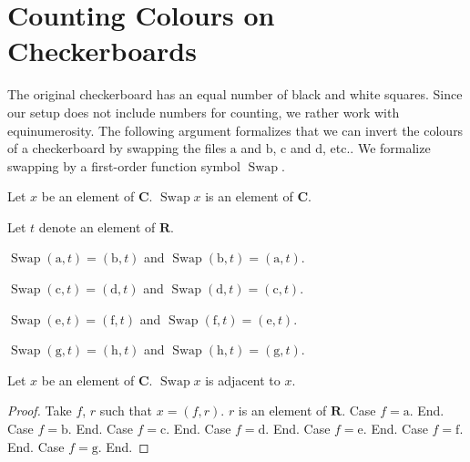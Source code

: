 \documentclass{article}
\newcommand{\Rank}{\mathbf{R}} %
\newcommand{\fileA}{\mathrm{a}}
\newcommand{\fileB}{\mathrm{b}}
\newcommand{\fileC}{\mathrm{c}}
\newcommand{\fileD}{\mathrm{d}}
\newcommand{\fileE}{\mathrm{e}}
\newcommand{\fileF}{\mathrm{f}}
\newcommand{\fileG}{\mathrm{g}}
\newcommand{\fileH}{\mathrm{h}}
\newcommand{\Checkerboard}{\mathbf{C}}
\newcommand{\Swap}[1]{\operatorname{Swap}#1}
\begin{document}
\section{Counting Colours on Checkerboards}

The original checkerboard has an equal number of black and white squares.
Since our setup does not include numbers for counting, we rather work with
equinumerosity. The following argument formalizes that we can invert the
colours of a checkerboard by swapping the files $\fileA$ and $\fileB$, $\fileC$ and $\fileD$, etc..
We formalize swapping by a first-order function symbol $\Swap{}$.

\begin{forthel}
    \begin{signature}
        Let $x$ be an element of $\Checkerboard$.
        $\Swap{x}$ is an element of $\Checkerboard$.
    \end{signature}

    Let $t$ denote an element of $\Rank$.

    \begin{axiom} $\Swap{(\fileA, t)} = (\fileB, t)$ and $\Swap{(\fileB, t)} = (\fileA, t)$. \end{axiom}

    \begin{axiom} $\Swap{(\fileC, t)} = (\fileD, t)$ and $\Swap{(\fileD, t)} = (\fileC, t)$. \end{axiom}

    \begin{axiom} $\Swap{(\fileE, t)} = (\fileF, t)$ and $\Swap{(\fileF, t)} = (\fileE, t)$. \end{axiom}

    \begin{axiom} $\Swap{(\fileG, t)} = (\fileH, t)$ and $\Swap{(\fileH, t)} = (\fileG, t)$. \end{axiom}

    \begin{lemma}
        Let $x$ be an element of $\Checkerboard$.
        $\Swap{x}$ is adjacent to $x$.
    \end{lemma}
    \begin{proof}
        Take $f$, $r$ such that $x = (f, r)$.
        $r$ is an element of $\Rank$.
        Case $f = \fileA$. End.
        Case $f = \fileB$. End.
        Case $f = \fileC$. End.
        Case $f = \fileD$. End.
        Case $f = \fileE$. End.
        Case $f = \fileF$. End.
        Case $f = \fileG$. End.
    \end{proof}
\end{forthel}
\end{document}
